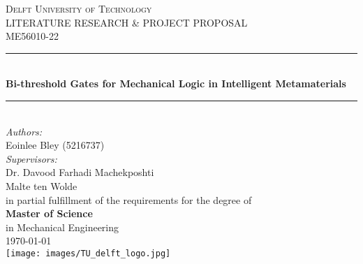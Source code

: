 \documentclass[a4paper]{article}
\begin{document}
\begin{titlepage}

\newcommand{\HRule}{\rule{\linewidth}{0.5mm}} 							%
\center 
 
\textsc{\LARGE Delft University of Technology}\\[1cm]

\textsc{\Large LITERATURE RESEARCH \& PROJECT PROPOSAL}\\[0.2cm]
\textsc{\large ME56010-22}\\[1cm] 										%
\HRule \\[0.8cm]
{ \huge \bfseries Bi-threshold Gates for Mechanical Logic in Intelligent Metamaterials }\\[0.7cm]								%
\HRule \\[2cm]
\large
\emph{Authors:}\\
Eoinlee Bley (5216737)\\[1.5cm]	
\emph{Supervisors:}\\
Dr. Davood Farhadi Machekposhti\\
Malte ten Wolde\\[1.5cm]
in partial fulfillment of the requirements for the degree of \\[0.5cm]
\textbf{Master of Science}\\
in Mechanical Engineering\\[0.5cm]
{\large \today}\\[5cm]
\texttt{[image: images/TU\_delft\_logo.jpg]}\\[1cm] 	%
\vfill 
\end{titlepage}

\begin{abstract}

\end{abstract}

\tableofcontents




\end{document}

